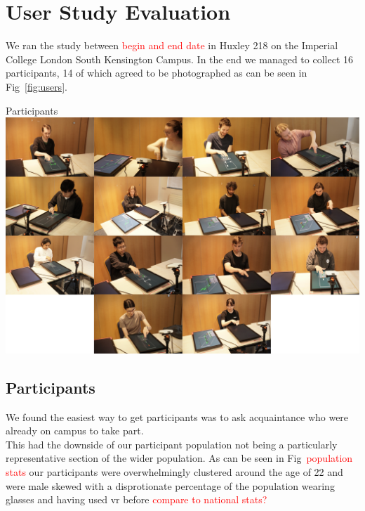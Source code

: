 \section{User Study Evaluation}
We ran the study between \textcolor{red}{begin and end date} in Huxley 218 on the Imperial College London South Kensington Campus. In the end we managed to collect 16 participants, 14 of which agreed to be photographed as can be seen in Fig~\ref{fig:users}.

\begin{figureBox}[label={fig:users}, width=1.0\linewidth]{Participants}
    \includegraphics[width = 1.0\linewidth]{./evaluation/figures/users.pdf}
\end{figureBox}

\subsection{Participants}
 We found the easiest way to get participants was to ask acquaintance who were already on campus to take part. \\

This had the downside of our participant population not being a particularly representative section of the wider population. As can be seen in Fig~\textcolor{red}{population stats} our participants were overwhelmingly clustered around the age of 22 and were male skewed with a disprotionate percentage of the population wearing glasses and having used vr before \textcolor{red}{compare to national stats?}

